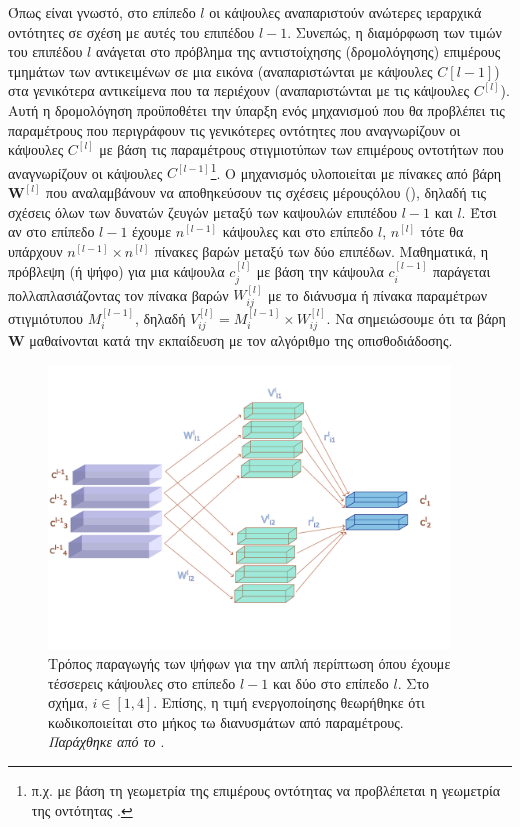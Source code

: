 Όπως είναι γνωστό, στο επίπεδο $l$ οι κάψουλες αναπαριστούν ανώτερες ιεραρχικά οντότητες σε σχέση με αυτές του επιπέδου $l-1$. Συνεπώς, η διαμόρφωση των τιμών του επιπέδου $l$ ανάγεται στο πρόβλημα της αντιστοίχησης (δρομολόγησης) επιμέρους τμημάτων των αντικειμένων σε μια εικόνα (αναπαριστώνται με κάψουλες $C{[l-1]}$) στα γενικότερα αντικείμενα που τα περιέχουν (αναπαριστώνται με τις κάψουλες $C^{[l]}$). Αυτή η δρομολόγηση προϋποθέτει την ύπαρξη ενός μηχανισμού που θα προβλέπει τις παραμέτρους που περιγράφουν τις γενικότερες οντότητες που αναγνωρίζουν οι κάψουλες $C^{[l]}$ με βάση τις παραμέτρους στιγμιοτύπων των επιμέρους οντοτήτων που αναγνωρίζουν οι κάψουλες $C^{[l-1]}$\footnote{π.χ. με βάση τη γεωμετρία της επιμέρους οντότητας  να προβλέπεται η γεωμετρία της οντότητας .}. O μηχανισμός υλοποιείται με πίνακες από βάρη $\boldsymbol{W}^{[l]}$ που αναλαμβάνουν να αποθηκεύσουν τις σχέσεις μέρους\textendash όλου (), δηλαδή τις σχέσεις όλων των δυνατών ζευγών μεταξύ των καψουλών επιπέδου $l-1$ και $l$. Έτσι αν στο επίπεδο $l-1$ έχουμε $n^{[l-1]}$ κάψουλες και στο επίπεδο $l$, $n^{[l]}$ τότε θα υπάρχουν $n^{[l-1]} \times n^{[l]}$ πίνακες βαρών μεταξύ των δύο επιπέδων. Μαθηματικά, η πρόβλεψη (ή ψήφο) για μια κάψουλα $c_j^{[l]}$ με βάση την κάψουλα $c_i^{[l-1]}$ παράγεται πολλαπλασιάζοντας τον πίνακα βαρών $W^{[l]}_{ij}$ με το διάνυσμα ή πίνακα παραμέτρων στιγμιότυπου $M_i^{[l-1]}$, δηλαδή $V^{[l]}_{ij} = M_i^{[l-1]}\times W^{[l]}_{ij}$. Να σημειώσουμε ότι τα βάρη $\boldsymbol{W}$ μαθαίνονται κατά την εκπαίδευση με τον αλγόριθμο της οπισθοδιάδοσης. \par

\begin{figure}[h]
  \centering
  \includegraphics[width=0.95\textwidth]{images/chapter theoritical background/capsule_voting.pdf}
  \caption{Τρόπος παραγωγής των ψήφων για την απλή περίπτωση όπου έχουμε τέσσερεις κάψουλες στο επίπεδο $l-1$ και δύο στο επίπεδο $l$. Στο σχήμα, $i \in [1,4]$. Επίσης, η τιμή ενεργοποίησης θεωρήθηκε ότι κωδικοποιείται στο μήκος τω διανυσμάτων από παραμέτρους. \textit{Παράχθηκε από το \href{https://inkscape.org/}{}}.}
  \label{fig:capsule_cast_votes}
\end{figure}

